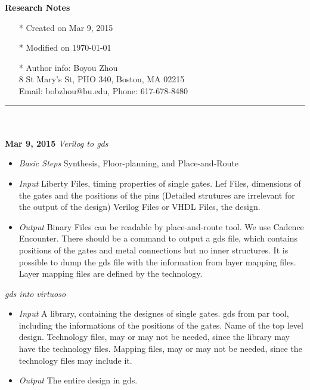\documentclass[]{article}
\begin{document}
\pagestyle{empty}
{\large\textbf{Research Notes}}
\begin{itemize}
    \item[*] Created on Mar 9, 2015
    \item[*] Modified on \today
    \item[*] Author info: Boyou Zhou\\
             8 St Mary's St, PHO 340, Boston, MA 02215\\
             Email: bobzhou@bu.edu, Phone: 617-678-8480
\end{itemize}


\rule[-0.1cm]{7.5in}{0.01cm}\\
\\
\noindent \textbf{Mar 9, 2015}
\textit{Verilog to gds}
\indent		\begin{itemize}
            \item \textit{Basic Steps} Synthesis, Floor-planning, and
            Place-and-Route
            \item \textit{Input} Liberty Files, timing properties of single
            gates. Lef Files, dimensions of the gates and the positions of the
            pins (Detailed strutures are irrelevant for the output of the
            design) Verilog Files or VHDL Files, the design.
            \item \textit{Output} Binary Files can be readable by
            place-and-route tool. We use Cadence Encounter. There should be a
            command to output a gds file, which contains positions of the gates
            and metal connections but no inner structures. It is possible to
            dump the gds file with the information from layer mapping files.
            Layer mapping files are defined by the technology.
        \end{itemize}

\textit{gds into virtuoso}
\indent		\begin{itemize}
            \item \textit{Input} A library, containing the designes of single
            gates. gds from par tool, including the informations of the
            positions of the gates. Name of the top level design. Technology
            files, may or may not be needed, since the library may have the
            technology files. Mapping files, may or may not be needed, since the
            technology files may include it.
            \item \textit{Output} The entire design in gds.
        \end{itemize}
\end{document}
